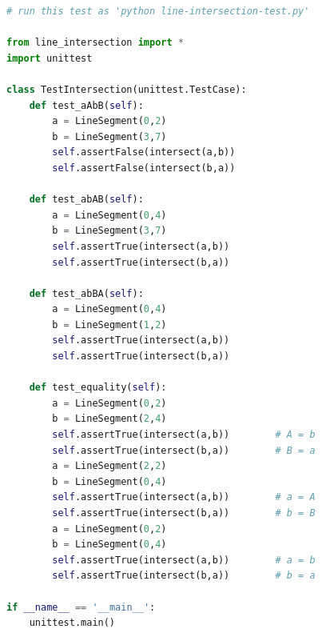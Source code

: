 \documentclass[10pt,usletter]{article}
\begin{document}
\begin{lstlisting}[language=Python]
# run this test as 'python line-intersection-test.py'

from line_intersection import *
import unittest

class TestIntersection(unittest.TestCase):
    def test_aAbB(self):
        a = LineSegment(0,2)
        b = LineSegment(3,7)
        self.assertFalse(intersect(a,b))
        self.assertFalse(intersect(b,a))

    def test_abAB(self):
        a = LineSegment(0,4)
        b = LineSegment(3,7)
        self.assertTrue(intersect(a,b))
        self.assertTrue(intersect(b,a))

    def test_abBA(self):
        a = LineSegment(0,4)
        b = LineSegment(1,2)
        self.assertTrue(intersect(a,b))
        self.assertTrue(intersect(b,a))

    def test_equality(self):
        a = LineSegment(0,2)
        b = LineSegment(2,4)
        self.assertTrue(intersect(a,b))        # A = b
        self.assertTrue(intersect(b,a))        # B = a
        a = LineSegment(2,2)
        b = LineSegment(0,4)
        self.assertTrue(intersect(a,b))        # a = A
        self.assertTrue(intersect(b,a))        # b = B
        a = LineSegment(0,2)
        b = LineSegment(0,4)
        self.assertTrue(intersect(a,b))        # a = b
        self.assertTrue(intersect(b,a))        # b = a

if __name__ == '__main__':
    unittest.main()

\end{lstlisting}
\end{document}
